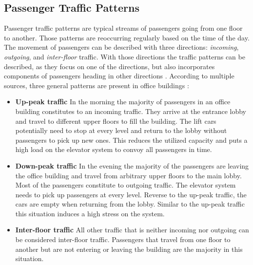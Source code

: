 %



\subsection{Passenger Traffic Patterns}
Passenger traffic patterns are typical streams of passengers going from one floor to another.
Those patterns are reoccurring regularly based on the time of the day.
The movement of passengers can be described with three directions: \emph{incoming}, \emph{outgoing}, and \emph{inter-floor} traffic.
With those directions the traffic patterns can be described, as they focus on one of the directions, but also incorporates components of passengers heading in other directions \autocite[][p.~259]{siikonen1993simulation}.
According to multiple sources, three general patterns are present in office buildings \autocite[][pp.~1--2]{beers2015arrivals}
\autocite[][pp.~6--7]{axelsson2013strategies}
\autocite[][p.~194]{unger2015aufzuege}
\autocite[][p.~14]{siikonen1997models}:

\begin{itemize}
    \item \textbf{Up-peak traffic} In the morning the majority of passengers in an office building constitutes to an incoming traffic.
    They arrive at the entrance lobby and travel to different upper floors to fill the building.
    The lift cars potentially need to stop at every level and return to the lobby without passengers to pick up new ones. 
    This reduces the utilized capacity and puts a high load on the elevator system to convoy all passengers in time.
    \item \textbf{Down-peak traffic} In the evening the majority of the passengers are leaving the office building and travel from arbitrary upper floors to the main lobby.
    Most of the passengers constitute to outgoing traffic.
    The elevator system needs to pick up passengers at every level. 
    Reverse to the up-peak traffic, the cars are empty when returning from the lobby.
    Similar to the up-peak traffic this situation induces a high stress on the system.
    \item \textbf{Inter-floor traffic} All other traffic that is neither incoming nor outgoing can be considered inter-floor traffic. Passengers that travel from one floor to another but are not entering or leaving the building are the majority in this situation.
\end{itemize}

